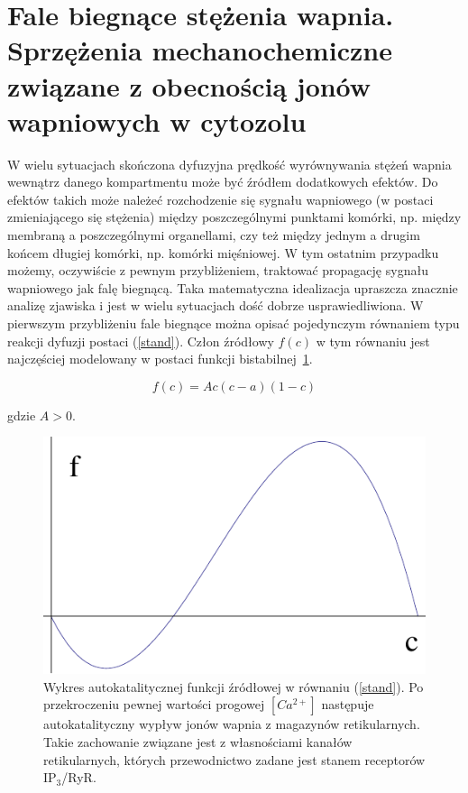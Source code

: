 \section [Fale biegnące stężenia wapnia. Sprzężenia mechanochemiczne]{Fale biegnące stężenia wapnia. Sprzężenia mechanochemiczne związane z obecnością jonów wapniowych w cytozolu}\label{s:faleBiegnace}

\medskip 

W wielu sytuacjach skończona dyfuzyjna prędkość wyrównywania stężeń wapnia wewnątrz danego kompartmentu może być źródłem dodatkowych efektów. Do efektów takich może należeć rozchodzenie się sygnału wapniowego (w postaci zmieniającego się stężenia) między poszczególnymi punktami komórki, np. między membraną a poszczególnymi organellami, czy też między jednym a drugim końcem długiej komórki, np. komórki mięśniowej. W tym ostatnim przypadku możemy, oczywiście z pewnym przybliżeniem, traktować propagację sygnału wapniowego jak falę biegnącą. Taka matematyczna idealizacja upraszcza znacznie analizę zjawiska i jest w wielu sytuacjach dość dobrze usprawiedliwiona. W pierwszym przybliżeniu fale biegnące można opisać pojedynczym równaniem typu reakcji dyfuzji postaci (\ref{stand}). Człon źródłowy $f(c)$ w tym równaniu jest najczęściej modelowany w postaci funkcji bistabilnej~\ref{f31}.

\[ f(c) = A c(c-a)(1-c) \] 

\noindent gdzie $A > 0$.
\begin{figure}[ht!]  
	\centering
	\hspace{2cm} \includegraphics[width=0.5 \linewidth]{rysunki/rozdzial_3/f_PLOT.pdf} 
	\caption[Wykres autokatalitycznej funkcji źródłowej]{{\small Wykres autokatalitycznej funkcji źródłowej w równaniu (\ref{stand}). Po przekroczeniu pewnej wartości progowej $[Ca^{2+}]$ następuje autokatalityczny wypływ jonów wapnia z magazynów retikularnych. Takie zachowanie związane jest z własnościami kanałów retikularnych, których przewodnictwo zadane jest stanem receptorów IP$_3$/RyR.}}
    \label{f31}
\end{figure}

